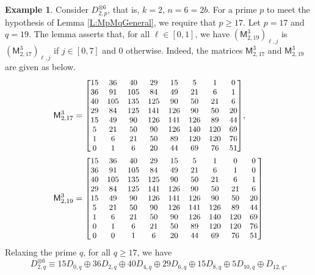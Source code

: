 \documentclass[12pt,reqno]{amsart}
\renewcommand{\geq}{\geqslant}
\newcommand{\M}{\mathsf{M}}
\theoremstyle{definition}
\newtheorem{eg}[thm]{Example}
\numberwithin{equation}{section}
\begin{document}
\begin{eg}
  Consider $D_{2,p}^{\otimes 6}$, that is, $k=2$, $n=6=2b$. For a prime $p$ to meet the hypothesis of Lemma \ref{L:MpMqGeneral}, we require that $p\geq 17$. Let $p=17$ and $q=19$. The lemma asserts that, for all $\ell\in [0,1]$, we have $(\M_{2,19}^3)_{\ell,j}$ is $(\M_{2,17}^3)_{\ell,j}$ if $j\in [0,7]$ and 0 otherwise. Indeed, the matrices $\M_{2,17}^3$ and $\M_{2,19}^3$ are given as below.
  \begin{align*}
    &\M_{2,17}^3=\small{\begin{bmatrix}
    		15 & 36 & 40 & 29 & 15 & 5 & 1 & 0 \\
    		36 & 91 & 105 & 84 & 49 & 21 & 6 & 1 \\
    		40 & 105 & 135 & 125 & 90 & 50 & 21 & 6 \\
    		29 & 84 & 125 & 141 & 126 & 90 & 50 & 20 \\
    		15 & 49 & 90 & 126 & 141 & 126 & 89 & 44 \\
    		5 & 21 & 50 & 90 & 126 & 140 & 120 & 69 \\
    		1 & 6 & 21 & 50 & 89 & 120 & 120 & 76 \\
    		0 & 1 & 6 & 20 & 44 & 69 & 76 & 51
    \end{bmatrix}}, \\
 &\M_{2,19}^3=\small{\begin{bmatrix}
 		15 & 36 & 40 & 29 & 15 & 5 & 1 & 0 & 0 \\
 		36 & 91 & 105 & 84 & 49 & 21 & 6 & 1 & 0 \\
 		40 & 105 & 135 & 125 & 90 & 50 & 21 & 6 & 1 \\
 		29 & 84 & 125 & 141 & 126 & 90 & 50 & 21 & 6 \\
 		15 & 49 & 90 & 126 & 141 & 126 & 90 & 50 & 20 \\
 		5 & 21 & 50 & 90 & 126 & 141 & 126 & 89 & 44 \\
 		1 & 6 & 21 & 50 & 90 & 126 & 140 & 120 & 69 \\
 		0 & 1 & 6 & 21 & 50 & 89 & 120 & 120 & 76 \\
 		0 & 0 & 1 & 6 & 20 & 44 & 69 & 76 & 51
 \end{bmatrix}}
  \end{align*} Relaxing the prime $q$, for all $q\geq 17$, we have \[D_{2,q}^{\otimes 6}\equiv 15D_{0,q}\oplus 36D_{2,q}\oplus 40D_{4,q}\oplus 29D_{6,q}\oplus 15D_{8,q} \oplus 5 D_{10,q} \oplus  D_{12,q}.\]
\end{eg}




\end{document}
